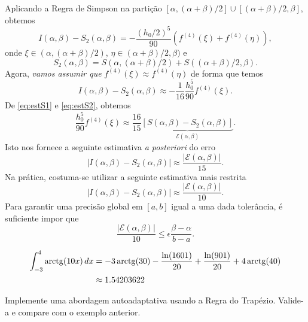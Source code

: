 Aplicando a Regra de Simpson na partição $[\alpha,(\alpha+\beta)/2]\cup [(\alpha+\beta)/2, \beta]$, obtemos
\begin{equation}
  I(\alpha,\beta) - S_2(\alpha,\beta) = -\frac{(h_0/2)^5}{90}\left(f^{(4)}(\xi) + f^{(4)}(\eta)\right),
\end{equation}
onde $\xi\in (\alpha,(\alpha+\beta)/2)$, $\eta\in (\alpha+\beta)/2, \beta)$ e
\begin{equation}
  S_2(\alpha,\beta) = S(\alpha,(\alpha+\beta)/2) + S((\alpha+\beta)/2,\beta).
\end{equation}
Agora, \emph{vamos assumir que} $f^{(4)}(\xi)\approx f^{(4)}(\eta)$ de forma que temos
\begin{equation}\label{eq:estS2}
  I(\alpha,\beta) - S_2(\alpha,\beta) \approx -\frac{1}{16}\frac{h_0^5}{90}f^{(4)}(\xi).
\end{equation}
De \eqref{eq:estS1} e \eqref{eq:estS2}, obtemos
\begin{equation}
  \frac{h_0^5}{90}f^{(4)}(\xi) \approx \frac{16}{15}\underbrace{\left[S(\alpha,\beta)-S_2(\alpha,\beta)\right]}_{\mathcal{E}(\alpha,\beta)}.
\end{equation}
Isto nos fornece a seguinte estimativa {\it a posteriori} do erro
\begin{equation}
  |I(\alpha,\beta)-S_2(\alpha,\beta)| \approx \frac{|\mathcal{E}(\alpha,\beta)|}{15}.
\end{equation}
Na prática, costuma-se utilizar a seguinte estimativa mais restrita
\begin{equation}
  |I(\alpha,\beta)-S_2(\alpha,\beta)| \approx \frac{|\mathcal{E}(\alpha,\beta)|}{10}.
\end{equation}
Para garantir uma precisão global em $[a,b]$ igual a uma dada tolerância, é suficiente impor que
\begin{equation}
  \frac{|\mathcal{E}(\alpha,\beta)|}{10} \leq \epsilon\frac{\beta-\alpha}{b-a}.
\end{equation}



\begin{ex}
  \begin{align}
    \int_{-3}^4\operatorname{arctg}(10x)\,dx &= -3\operatorname{arctg}(30) - \frac{\ln(1601)}{20} + \frac{\ln(901)}{20} + 4\operatorname{arctg}(40)\\
                               &\approx 1.54203622
  \end{align}
\end{ex}

\begin{exer}
  Implemente uma abordagem autoadaptativa usando a Regra do Trapézio. Valide-a e compare com o exemplo anterior.
\end{exer}

